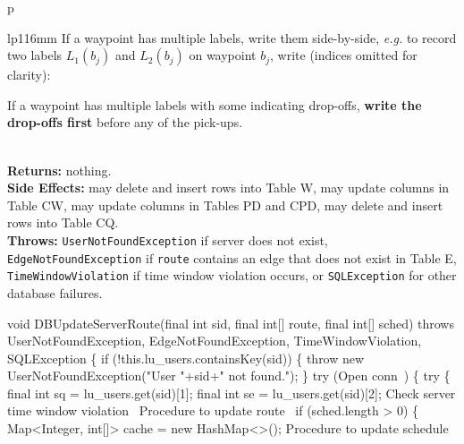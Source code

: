 \begin{tabular}{p{\textwidth}}
\begin{tabular}{lp{116mm}}
If a waypoint has multiple labels, write them side-by-side, \textit{e.g.}
to record two labels $L_1(b_j)$ and $L_2(b_j)$ on waypoint $b_j$, write
(indices omitted for clarity):


If a waypoint has multiple labels with some indicating drop-offs, \textbf{write
the drop-offs first} before any of the pick-ups.
\end{tabular}\\
\textbf{Returns:} nothing.\\
\textbf{Side Effects:} may delete and insert rows into Table W, may
update columns in Table CW, may update columns in Tables PD and CPD,
may delete and insert rows into Table CQ.\\
\textbf{Throws:} {\tt{}UserNotFoundException} if server does not exist,
{\tt{}EdgeNotFoundException} if {\tt{}route} contains an edge that does not exist
in Table E,
{\tt{}TimeWindowViolation} if time window violation occurs,
or {\tt{}SQLException} for other database failures.\\
\bottomrule
\end{tabular}
\nwenddocs{}\endmoddef{}
void DBUpdateServerRoute(final int sid, final int[] route, final int[] sched)
throws UserNotFoundException, EdgeNotFoundException, TimeWindowViolation, SQLException \{
  if (!this.lu_users.containsKey(sid)) \{
    throw new UserNotFoundException("User "+sid+" not found.");
  \}
  try (\LA{}Open \code{}conn\edoc{}~{\nwtagstyle{}}\RA{}) \{
    try \{
      final int sq = lu_users.get(sid)[1];
      final int se = lu_users.get(sid)[2];
      \LA{}Check server time window violation~{\nwtagstyle{}}\RA{}
      \LA{}Procedure to update route~{\nwtagstyle{}}\RA{}
      if (sched.length > 0) \{
        Map<Integer, int[]> cache = new HashMap<>();
        \LA{}Procedure to update schedule~{\nwtagstyle{}}\RA{}
